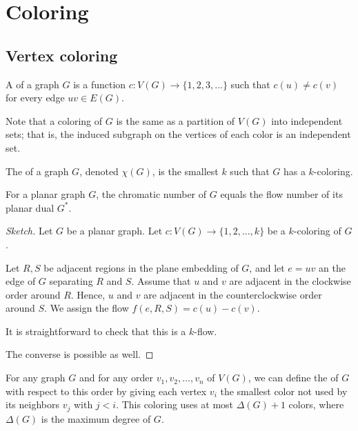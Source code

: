 \chapter{Coloring}

\section{Vertex coloring}

\begin{definition}[Coloring]
    A  of a graph \(G\)
    is a function \(c \colon V(G) \to \{1, 2, 3, \ldots\}\)
    such that \(c(u) \neq c(v)\) for every edge \(uv \in E(G)\).
\end{definition}

Note that a coloring of \(G\) is the same as a partition of \(V(G)\) into independent sets; that is, the induced subgraph on the vertices of each color is an independent set.

\begin{definition}
    The  of a graph \(G\), denoted \(\chi(G)\), is the smallest \(k\) such that \(G\) has a \(k\)-coloring.
\end{definition}

\begin{proposition}
    For a planar graph \(G\),
    the chromatic number of \(G\)
    equals the flow number of its planar dual \(G^*\).
\end{proposition}

\begin{proof}[Sketch]
    Let \(G\) be a planar graph.
    Let \(c \colon V(G) \to \{1, 2, \ldots, k\}\) be a \(k\)-coloring of \(G\).

    Let \(R, S\) be adjacent regions in the plane embedding of \(G\), and let \(e = uv\) an the edge of \(G\) separating \(R\) and \(S\).
    Assume that \(u\) and \(v\) are adjacent in the clockwise order around \(R\).
    Hence, \(u\) and \(v\) are adjacent in the counterclockwise order around \(S\).
    We assign the flow \(f(e, R, S) = c(u) - c(v)\).

    It is straightforward to check that this is a \(k\)-flow.

    The converse is possible as well.
\end{proof}

For any graph \(G\) and for any order \(v_1, v_2, \ldots, v_n\) of \(V(G)\), we can define the  of \(G\) with respect to this order by giving each vertex \(v_i\) the smallest color not used by its neighbors \(v_j\) with \(j < i\).
This coloring uses at most \(\Delta(G) + 1\) colors,
where \(\Delta(G)\) is the maximum degree of \(G\).

